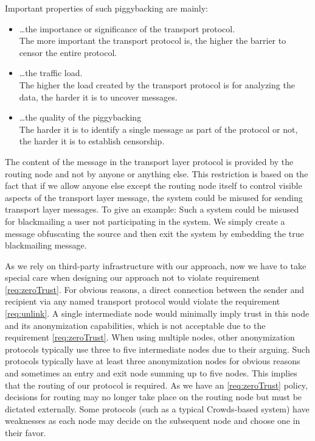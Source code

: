 Important properties of such piggybacking are mainly:
\begin{itemize}
	\item \ldots the importance or significance of the transport protocol.\\
	The more important the transport protocol is, the higher the barrier to censor the entire protocol.
	\item \ldots the traffic load.\\
	The higher the load created by the transport protocol is for analyzing the data, the harder it is to uncover messages.
	\item \ldots the quality of the piggybacking\\
	The harder it is to identify a single message as part of the protocol or not, the harder it is to establish censorship.
\end{itemize} 

The content of the message in the transport layer protocol is provided by the routing node and not by anyone or anything else. This restriction is based on the fact that if we allow anyone else except the routing node itself to control visible aspects of the transport layer message, the system could be misused for sending transport layer messages. To give an example: Such a system could be misused for blackmailing a user not participating in the system. We simply create a message obfuscating the source and then exit the system by embedding the true blackmailing message. 

As we rely on third-party infrastructure with our approach, now we have to take special care when designing our approach not to violate requirement \ref{req:zeroTrust}. For obvious reasons, a direct connection between the sender and recipient via any named transport protocol would violate the requirement \ref{req:unlink}. A single intermediate node would minimally imply trust in this node and its anonymization capabilities, which is not acceptable due to the requirement \ref{req:zeroTrust}. When using multiple nodes, other anonymization protocols typically use three to five intermediate nodes due to their arguing. Such protocols typically have at least three anonymization nodes for obvious reasons and sometimes an entry and exit node summing up to five nodes. This implies that the routing of our protocol is required. As we have an \ref{req:zeroTrust} policy, decisions for routing may no longer take place on the routing node but must be dictated externally. Some protocols (such as a typical Crowds-based system) have weaknesses as each node may decide on the subsequent node and choose one in their favor.

